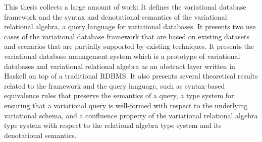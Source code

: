 %
This thesis collects a large amount of work: 
%
It defines the variational database framework and the syntax and denotational
semantics of the variational relational algebra, a query language for variational databases.
%
%
It presents two use cases of the variational database framework that are based on existing 
datasets and scenarios that are partially supported by existing techniques.
%
It presents the variational database management system which is a prototype  of 
 variational databases and variational relational algebra as an abstract layer written in Haskell
on top of a traditional RDBMS. 
%
It also presents several theoretical results related to the framework and the query language, such 
as syntax-based equivalence rules that preserve the semantics of a query, 
a type system for ensuring that a variational query is well-formed with respect to the 
underlying variational schema, and a confluence property of the variational relational
algebra type system with respect to the relational algebra type system and its denotational
semantics.
